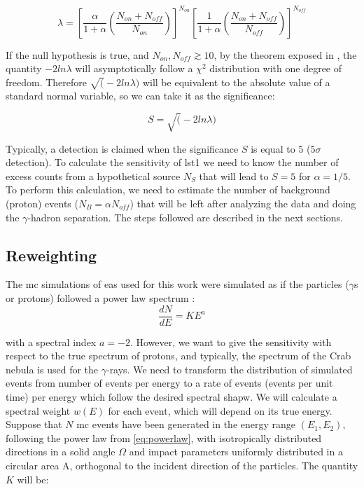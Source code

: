 \documentclass[main.tex]{subfiles}
\begin{document}
\begin{equation}
  \lambda = \left[ \frac{\alpha}{1+\alpha}\left( \frac{N_{on}+N_{off}}{N_{on}}\right) \right]^{N_{on}} \left[ \frac{1}{1+\alpha}\left( \frac{N_{on}+N_{off}}{N_{off}}\right)\right]^{N_{off}}
\end{equation}

If the null hypothesis is true, and $N_{on}, N_{off} \gtrsim 10$, by the theorem exposed in \cite{1983LiMa}, the quantity $-2ln\lambda$ will asymptotically follow a $\chi^2$ distribution with one degree of freedom. Therefore $\sqrt(-2ln\lambda)$ will be equivalent to the absolute value of a standard normal variable, so we can take it as the significance:

\begin{equation}
  S = \sqrt(-2ln\lambda)
\end{equation}

Typically, a detection is claimed when the significance $S$ is equal to 5 ($5\sigma$ detection). To calculate the sensitivity of \gls{lst}1 we need to know the number of excess counts from a hypothetical source $N_{S}$ that will lead to $S=5$ for $\alpha=1/5$. \\
To perform this calculation, we need to estimate the number of background (proton) events ($N_{B} = \alpha N_{off}$) that will be left after analyzing the data and doing the $\gamma$-hadron separation. The steps followed are described in the next sections.

\subsection{Reweighting}

The \gls{mc} simulations of \gls{eas} used for this work were simulated as if the particles ($\gamma$s or protons) followed a power law spectrum
:
\begin{equation} \label{eq:powerlaw}
\frac{dN}{dE} = K E^{a}
\end{equation}

with a spectral index $a=-2$. However, we want to give the sensitivity with respect to the true spectrum of protons, and typically, the spectrum of the Crab nebula is used for the $\gamma$-rays. We need to transform the distribution of simulated events from number of events per energy to a rate of events (events per unit time) per energy which follow the desired spectral shapw. We will calculate a spectral weight $w(E)$ for each event, which will depend on its true energy.\\
Suppose that $N$ \gls{mc} events have been generated in the energy range $(E_1,E_2)$, following the power law from \ref{eq:powerlaw}, with isotropically distributed directions in a solid angle $\Omega$ and impact parameters uniformly distributed in a circular area A, orthogonal to the incident direction of the particles.
The quantity $K$ will be:
\end{document}
